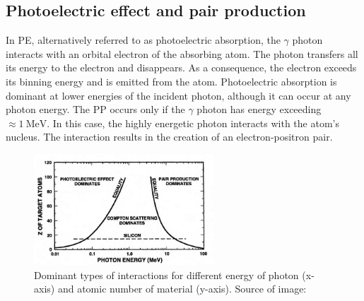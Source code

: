 \subsection{Photoelectric effect and pair production}
In \ac{PE}, alternatively referred to as photoelectric absorption, the $\gamma$ photon interacts with an orbital electron of the absorbing atom.
The photon transfers all its energy to the electron and disappears.
As a consequence, the electron exceeds its binning energy and is emitted from the atom.
Photoelectric absorption is dominant at lower energies of the incident photon, although it can occur at any photon energy.
The \ac{PP} occurs only if the $\gamma$ photon has energy exceeding $\approx \SI{1}{\mega\electronvolt}$.
In this case, the highly energetic photon interacts with the atom's nucleus. 
The interaction results in the creation of an electron-positron pair.

\begin{figure}[!h]
  \centering 

    \includegraphics[width=0.6\textwidth]{./fig/photos/dominant.png}
  \caption{Dominant types of interactions for different energy of photon (x-axis) and atomic number of material (y-axis). Source of image: \cite{schwank}}
    \label{fig:dominant}
  
\end{figure}

